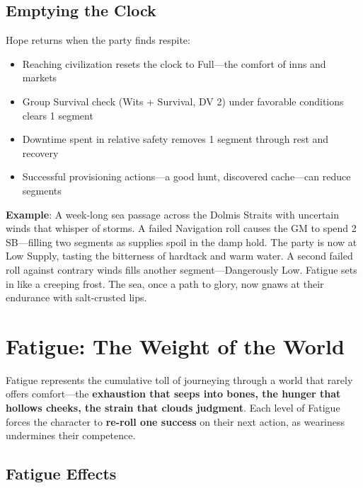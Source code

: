 \subsection*{Emptying the Clock}

Hope returns when the party finds respite:

\begin{itemize}
    \item Reaching civilization resets the clock to Full—the comfort of inns and markets
    \item Group Survival check (Wits + Survival, DV 2) under favorable conditions clears 1 segment
    \item Downtime spent in relative safety removes 1 segment through rest and recovery
    \item Successful provisioning actions—a good hunt, discovered cache—can reduce segments
\end{itemize}

\textbf{Example}: A week-long sea passage across the Dolmis Straits with uncertain winds that whisper of storms. A failed Navigation roll causes the GM to spend 2 SB---filling two segments as supplies spoil in the damp hold. The party is now at Low Supply, tasting the bitterness of hardtack and warm water. A second failed roll against contrary winds fills another segment---Dangerously Low. Fatigue sets in like a creeping frost. The sea, once a path to glory, now gnaws at their endurance with salt-crusted lips.

\section*{Fatigue: The Weight of the World}

Fatigue represents the cumulative toll of journeying through a world that rarely offers comfort---the \textbf{exhaustion that seeps into bones, the hunger that hollows cheeks, the strain that clouds judgment}. Each level of Fatigue forces the character to \textbf{re-roll one success} on their next action, as weariness undermines their competence.

\subsection*{Fatigue Effects}

